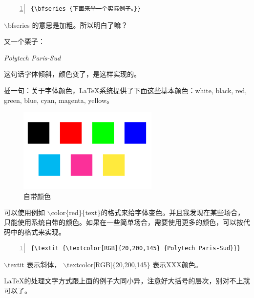 \documentclass[12pt,a4paper,oneside]{book}
\begin{document}
{\cons 
\begin{lstlisting}[numbers=left, numberstyle=\tiny, keywordstyle=\color{blue!70},  frame=shadowbox, rulesepcolor=\color{red!20!green!20!blue!20}]
{\bfseries {下面来举一个实际例子。}}
\end{lstlisting}
\par
$\backslash$bfseries 的意思是加粗。所以明白了嘛？
\par
又一个栗子：
\par
{\textit {\textcolor[RGB]{20,200,145} {Polytech Paris-Sud}}}
\par
这句话字体倾斜，颜色变了，是这样实现的。
\par
插一句：关于字体颜色，\LaTeX 系统提供了下面这些基本颜色：white, black, red, green, blue, cyan, magenta, yellow。 \begin{figure}[htp] 
\centering 
\includegraphics[scale=0.85]{Figures/bc.png}
\caption{自带颜色}%
\label{pic:bc}
\end{figure}可以使用例如 $\backslash$color\{red\}\{text\}的格式来给字体变色。并且我发现在某些场合，只能使用系统自带的颜色。如果在一些简单场合，需要使用更多的颜色，可以按代码中的格式来实现。
\begin{lstlisting}[language={[ANSI]C}, numbers=left, numberstyle=\tiny, keywordstyle=\color{blue!70},  frame=shadowbox, rulesepcolor=\color{red!20!green!20!blue!20}]
{\textit {\textcolor[RGB]{20,200,145} {Polytech Paris-Sud}}}
\end{lstlisting}
\par
$\backslash$textit 表示斜体， $\backslash$textcolor[RGB]$\{$20,200,145$\}$ 表示XXX颜色。

\par
\LaTeX 的处理文字方式跟上面的例子大同小异，注意好大括号的层次，别对不上就可以了。
\vspace{2em}
}
\end{document}
